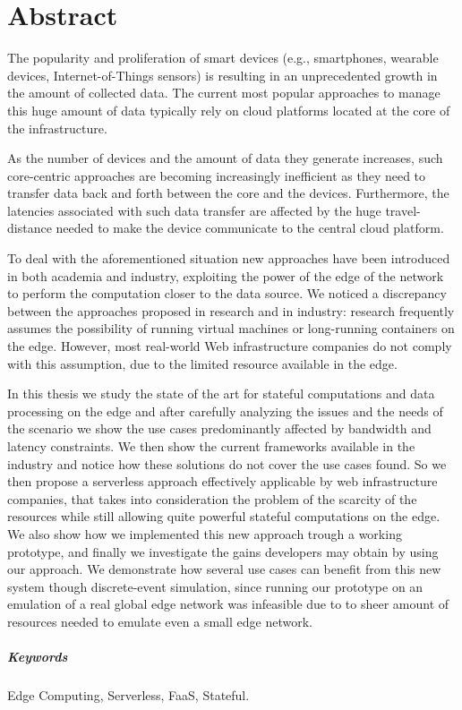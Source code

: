 \chapter{Abstract}

The popularity and proliferation of smart devices (e.g., smartphones, wearable devices, Internet-of-Things sensors) is resulting in an unprecedented growth in the amount of collected data. The current most popular approaches to manage this huge amount of data typically rely on cloud platforms located at the core of the infrastructure.

As the number of devices and the amount of data they generate increases, such core-centric approaches are becoming increasingly inefficient as they need to transfer data back and forth between the core and the devices. Furthermore, the latencies associated with such data transfer are affected by the huge travel-distance needed to make the device communicate to the central cloud platform.

To deal with the aforementioned situation new approaches have been introduced in both academia and industry, exploiting the power of the edge of the network to perform the computation closer to the data source. We noticed a discrepancy between the approaches proposed in research and in industry: research frequently assumes the possibility of running virtual machines or long-running containers on the edge. However, most real-world Web infrastructure companies do not comply with this assumption, due to the limited resource available in the edge.

In this thesis we study the state of the art for stateful computations and data processing on the edge and after carefully analyzing the issues and the needs of the scenario we show the use cases predominantly affected by bandwidth and latency constraints. We then show the current frameworks available in the industry and notice how these solutions do not cover the use cases found. So we then propose a serverless approach effectively applicable by web infrastructure companies, that takes into consideration the problem of the scarcity of the resources while still allowing quite powerful stateful computations on the edge. We also show how we implemented this new approach trough a working prototype, and finally we investigate the gains developers may obtain by using our approach. We demonstrate how several use cases can benefit from this new system though discrete-event simulation, since running our prototype on an emulation of a real global edge network was infeasible due to to sheer amount of resources needed to emulate even a small edge network.

\paragraph{Keywords}  Edge Computing, Serverless, FaaS, Stateful.